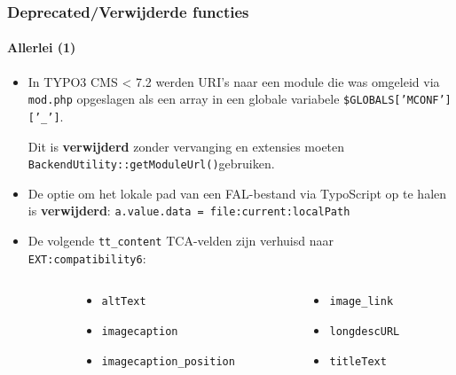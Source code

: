 \begin{frame}[fragile]
	\frametitle{Deprecated/Verwijderde functies}
	\framesubtitle{Allerlei (1)}

	\begin{itemize}

		\item In TYPO3 CMS < 7.2 werden URI's naar een module die was omgeleid via
			\texttt{mod.php} opgeslagen als een array in een globale variabele
			\small\texttt{\$GLOBALS['MCONF']['\_']}\normalsize.

			Dit is \textbf{verwijderd} zonder vervanging en extensies moeten
			\texttt{BackendUtility::getModuleUrl()}\normalsize\space gebruiken.

		\item De optie om het lokale pad van een FAL-bestand via TypoScript op te halen is
			\textbf{verwijderd}: \texttt{a.value.data = file:current:localPath}

		\item De volgende \texttt{tt\_content} TCA-velden zijn verhuisd naar
			\texttt{EXT:compatibility6}:

	\end{itemize}

	\vspace{-0.2cm}

	\begin{columns}[T]
		\begin{column}{.06\textwidth}
		\end{column}
		\begin{column}{.47\textwidth}
			\smaller
			\begin{itemize}
				\item \texttt{altText}
				\item \texttt{imagecaption}
				\item \texttt{imagecaption\_position}
			\end{itemize}
			\normalsize
		\end{column}
		\begin{column}{.47\textwidth}
			\smaller
			\begin{itemize}
				\item \texttt{image\_link}
				\item \texttt{longdescURL}
				\item \texttt{titleText}
			\end{itemize}
			\normalsize
		\end{column}
	\end{columns}

\end{frame}

